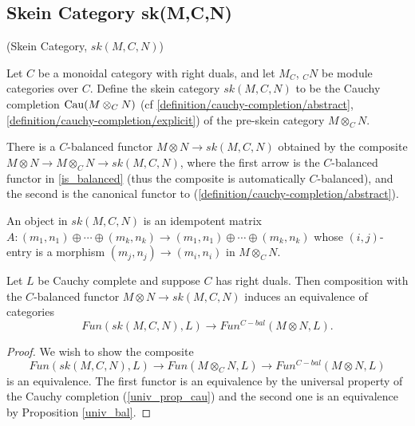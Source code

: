 \subsection{Skein Category sk(M,C,N)}

\begin{definition} (Skein Category, $sk(M,C,N)$)

  \noindent Let $C$ be a monoidal category with right duals, and let $M_C$,
  $_{C}N$ be module categories over $C$. Define the skein category $sk(M,C,N)$
  to be the Cauchy completion $\operatorname{Cau}(M \otimes_{C} N)$ (cf
  \ref{definition/cauchy-completion/abstract},
  \ref{definition/cauchy-completion/explicit}) of the pre-skein category $M
  \otimes_{C} N$.
\end{definition}

\begin{remark}
  There is a $C$-balanced functor $M\otimes N \to sk(M,C,N)$ obtained by the
  composite $M\otimes N\to M\otimes_C N\to sk(M,C,N)$, where the first arrow
  is the $C$-balanced functor in \ref{is_balanced} (thus the composite is
  automatically $C$-balanced), and the second is the canonical functor to
  (\ref{definition/cauchy-completion/abstract}).
\end{remark}

\begin{remark}
  An object in $sk(M,C,N)$ is an idempotent matrix
  $A:(m_1,n_1)\oplus\cdots\oplus (m_k,n_k)\to (m_1,n_1)\oplus\cdots\oplus
  (m_k,n_k)$ whose $(i,j)$-entry is a morphism $(m_j,n_j)\to (m_i,n_i)$ in
  $M\otimes_C N$.
\end{remark}

\begin{proposition}\label{univ_sk}
  Let $L$ be Cauchy complete and suppose $C$ has right duals. Then composition
  with the $C$-balanced functor $M\otimes N\to sk(M,C,N)$ induces an
  equivalence of categories $$Fun(sk(M,C,N),L)\to Fun^{C-bal}(M\otimes N,L).$$
\end{proposition}

\begin{proof}
  We wish to show the composite $$Fun(sk(M,C,N),L)\to Fun(M\otimes_C N, L)\to
  Fun^{C-bal}(M\otimes N,L)$$ is an equivalence. The first functor is an
  equivalence by the universal property of the Cauchy completion
  (\ref{univ_prop_cau}) and the second one is an equivalence by Proposition
  \ref{univ_bal}.
\end{proof}

